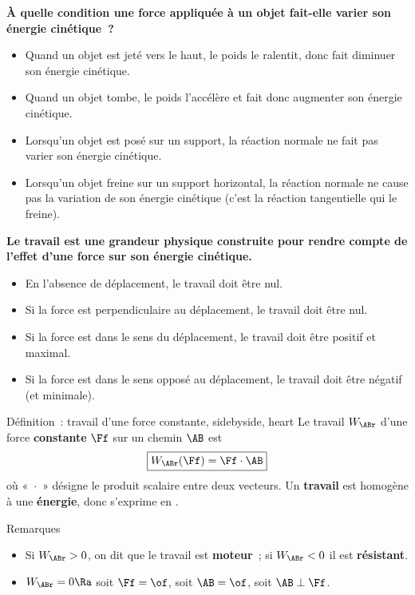\documentclass[../main/main.tex]{subfiles}
\begin{document}
\textbf{À quelle condition une force appliquée à un objet fait-elle varier son
énergie cinétique~?}
\begin{itemize}
    \item Quand un objet est jeté vers le haut, le poids le ralentit, donc fait
        diminuer son énergie cinétique.
    \item Quand un objet tombe, le poids l’accélère et fait donc augmenter son
        énergie cinétique.
    \item Lorsqu’un objet est posé sur un support, la réaction normale ne fait
        pas varier son énergie cinétique.
    \item Lorsqu’un objet freine sur un support horizontal, la réaction normale
        ne cause pas la variation de son énergie cinétique (c’est la réaction
        tangentielle qui le freine).
\end{itemize}
\textbf{Le travail est une grandeur physique construite pour rendre compte de
l’effet d’une force sur son énergie cinétique.}
\begin{itemize}
    \item En l’absence de déplacement, le travail doit être nul.
    \item Si la force est perpendiculaire au déplacement, le travail doit être
        nul.
    \item Si la force est dans le sens du déplacement, le travail doit être
        positif et maximal.
    \item Si la force est dans le sens opposé au déplacement, le travail doit
        être négatif (et minimale).
\end{itemize}

\begin{tdefi}{Définition~: travail d'une force constante, sidebyside, heart}
    Le travail $W_{\ABr}$ d'une force \textbf{constante} $\Ff$ sur un chemin $\AB$ est
    \[\boxed{W_{\ABr}(\Ff) = \Ff\cdot\AB}\]
    où «~$\cdot$~» désigne le produit scalaire entre deux vecteurs.
    \tcblower
    Un \textbf{travail} est homogène à une \textbf{énergie}, donc s'exprime en
    .
\end{tdefi}

\begin{rrema}{Remarques}
    \begin{itemize}
        \item Si $W_{\ABr} > 0$, on dit que le travail est \textbf{moteur}~; si
            $W_{\ABr} < 0$ il est \textbf{résistant}.
        \item $W_{\ABr} = 0 \Ra$ soit $\Ff = \of$, soit $\AB = \of$, soit
            $\AB\perp\Ff$.
    \end{itemize}
\end{rrema}
\end{document}
